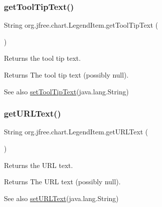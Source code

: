 \subsubsection{\texorpdfstring{get\+Tool\+Tip\+Text()}{getToolTipText()}}
{\footnotesize\ttfamily String org.\+jfree.\+chart.\+Legend\+Item.\+get\+Tool\+Tip\+Text (\begin{DoxyParamCaption}{ }\end{DoxyParamCaption})}

Returns the tool tip text.

\begin{DoxyReturn}{Returns}
The tool tip text (possibly {\ttfamily null}).
\end{DoxyReturn}
\begin{DoxySeeAlso}{See also}
\mbox{\hyperlink{classorg_1_1jfree_1_1chart_1_1_legend_item_ae68b2cb07d9d47a099195c1e53cf7ac8}{set\+Tool\+Tip\+Text}}(java.\+lang.\+String) 
\end{DoxySeeAlso}
\mbox{\label{classorg_1_1jfree_1_1chart_1_1_legend_item_ae50e62bf0aebde30e8e8e1c5fac9952f}} 
\subsubsection{\texorpdfstring{get\+U\+R\+L\+Text()}{getURLText()}}
{\footnotesize\ttfamily String org.\+jfree.\+chart.\+Legend\+Item.\+get\+U\+R\+L\+Text (\begin{DoxyParamCaption}{ }\end{DoxyParamCaption})}

Returns the U\+RL text.

\begin{DoxyReturn}{Returns}
The U\+RL text (possibly {\ttfamily null}).
\end{DoxyReturn}
\begin{DoxySeeAlso}{See also}
\mbox{\hyperlink{classorg_1_1jfree_1_1chart_1_1_legend_item_a63d5f8c94b5296c1ccfb8adf20f79def}{set\+U\+R\+L\+Text}}(java.\+lang.\+String) 
\end{DoxySeeAlso}
\mbox{\label{classorg_1_1jfree_1_1chart_1_1_legend_item_af99c8d8cee770e72ecddaf3b2cf467b1}} 

